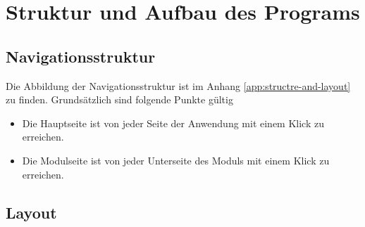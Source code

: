 \chapter{Struktur und Aufbau des Programs}

%
%
%
\section{Navigationsstruktur}
\label{sec:navigation}
Die Abbildung der Navigationsstruktur ist im Anhang \ref{app:structre-and-layout} zu finden.
Grundsätzlich sind folgende Punkte gültig
\begin{itemize}
  \item Die Hauptseite ist von jeder Seite der Anwendung mit einem Klick zu erreichen.
  \item Die Modulseite ist von jeder Unterseite des Moduls mit einem Klick zu erreichen.
\end{itemize}

%
%
%
\section{Layout}
\label{sec:layout}

